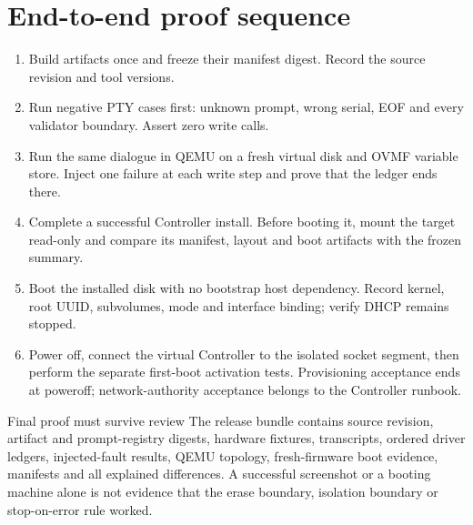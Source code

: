 \section{End-to-end proof sequence}
\begin{enumerate}
\item Build artifacts once and freeze their manifest digest. Record the source
revision and tool versions.
\item Run negative PTY cases first: unknown prompt, wrong serial, EOF and every
validator boundary. Assert zero write calls.
\item Run the same dialogue in QEMU on a fresh virtual disk and OVMF variable
store. Inject one failure at each write step and prove that the ledger ends
there.
\item Complete a successful Controller install. Before booting it, mount the
target read-only and compare its manifest, layout and boot artifacts with the
frozen summary.
\item Boot the installed disk with no bootstrap host dependency. Record kernel,
root UUID, subvolumes, mode and interface binding; verify DHCP remains stopped.
\item Power off, connect the virtual Controller to the isolated socket segment,
then perform the separate first-boot activation tests. Provisioning acceptance
ends at poweroff; network-authority acceptance belongs to the Controller
runbook.
\end{enumerate}

\begin{gate}{Final proof must survive review}
The release bundle contains source revision, artifact and prompt-registry
digests, hardware fixtures, transcripts, ordered driver ledgers, injected-fault
results, QEMU topology, fresh-firmware boot evidence, manifests and all
explained differences. A successful screenshot or a booting machine alone is
not evidence that the erase boundary, isolation boundary or stop-on-error rule
worked.
\end{gate}

